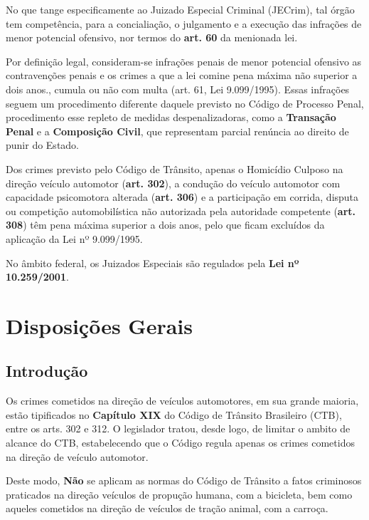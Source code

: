 \documentclass[
  letterpaper,
  DIV=11,
  numbers=noendperiod]{scrreport}
\begin{document}
No que tange especificamente ao Juizado Especial Criminal (JECrim), tal
órgão tem competência, para a concialiação, o julgamento e a execução
das infrações de menor potencial ofensivo, nor termos do \textbf{art.
60} da menionada lei.

Por definição legal, consideram-se infrações penais de menor potencial
ofensivo as contravenções penais e os crimes a que a lei comine pena
máxima não superior a dois anos., cumula ou não com multa (art. 61, Lei
9.099/1995). Essas infrações seguem um procedimento diferente daquele
previsto no Código de Processo Penal, procedimento esse repleto de
medidas despenalizadoras, como a \textbf{Transação Penal} e a
\textbf{Composição Civil}, que representam parcial renúncia ao direito
de punir do Estado.

Dos crimes previsto pelo Código de Trânsito, apenas o Homicídio Culposo
na direção veículo automotor (\textbf{art. 302}), a condução do veículo
automotor com capacidade psicomotora alterada (\textbf{art. 306}) e a
participação em corrida, disputa ou competição automobilística não
autorizada pela autoridade competente (\textbf{art. 308}) têm pena
máxima superior a dois anos, pelo que ficam excluídos da aplicação da
Lei nº 9.099/1995.

No âmbito federal, os Juizados Especiais são regulados pela \textbf{Lei
nº 10.259/2001}.


\hypertarget{disposiuxe7uxf5es-gerais}{%
\chapter{Disposições Gerais}\label{disposiuxe7uxf5es-gerais}}

\hypertarget{introduuxe7uxe3o}{%
\section{Introdução}\label{introduuxe7uxe3o}}

Os crimes cometidos na direção de veículos automotores, em sua grande
maioria, estão tipificados no \textbf{Capítulo XIX} do Código de
Trânsito Brasileiro (CTB), entre os arts. 302 e 312. O legislador
tratou, desde logo, de limitar o ambito de alcance do CTB, estabelecendo
que o Código regula apenas os crimes cometidos na direção de veículo
automotor.

Deste modo, \textbf{Não} se aplicam as normas do Código de Trânsito a
fatos criminosos praticados na direção veículos de propução humana, com
a bicicleta, bem como aqueles cometidos na direção de veículos de tração
animal, com a carroça.
\end{document}
